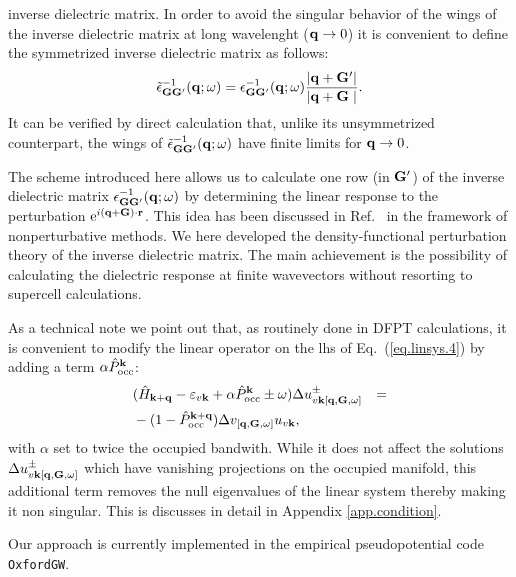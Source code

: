 \documentclass[twocolumn,prb,showpacs,superscriptaddress]{revtex4}
\def\w{\omega}
\def\H{\hat{H}}
\def\P{\hat{P}_{\rm occ}}
\def\E{\varepsilon}
\def\q{{\bf q}}
\def\k{{\bf k}}
\def\G{{\bf G}}
\def\Gp{{\bf G^\prime}}
\def\r{{\bf r}}
\begin{document}
inverse dielectric matrix. 
%
In order to avoid the singular behavior of the wings of the inverse dielectric matrix 
at long wavelenght ($\q\rightarrow 0$) it is convenient to define the symmetrized inverse
dielectric matrix as follows:\cite{balde_tosa}
  \begin{equation}
  \tilde\epsilon^{-1}_{\G\Gp}(\q;\w) = \epsilon^{-1}_{\G\Gp}(\q;\w)  \frac{|\q+\Gp|}{|\q+\G\phantom{^\prime}|}.
  \end{equation}
It can be verified by direct calculation that, unlike its unsymmetrized counterpart,
the wings of $\tilde\epsilon^{-1}_{\G\Gp}(\q;\w)$ have finite limits for $\q\rightarrow 0$.

The scheme introduced here allows us to calculate one row (in $\Gp$) of the inverse dielectric
matrix $\epsilon^{-1}_{\G\Gp}(\q;\w)$ by determining the linear response to the
perturbation ${\rm e}^{i(\q+\G)\cdot\r}$. This idea has been discussed in Ref.\ 
in the framework of nonperturbative methods. We here developed the density-functional
perturbation theory of the inverse dielectric matrix. The main achievement is the
possibility of calculating the dielectric response at finite wavevectors without
resorting to supercell calculations.

As a technical note we point out that, as routinely done in DFPT calculations, 
it is convenient to modify the linear operator on the lhs of Eq.\ (\ref{eq.linsys.4}) by adding
a term $\alpha \P^\k$:
 \begin{eqnarray} \label{eq.linsys.5}
&  (\H_{\k+\q}-\E_{v\k}+\alpha\P^\k \pm\w) \Delta u^\pm_{v\k[\q,\G,\w]}  & = \nonumber \\
&   -(1-\P^{\k+\q}) \Delta v_{[\q,\G,\w]} u_{v\k}, & 
  \end{eqnarray}
with $\alpha$ set to twice the occupied bandwith.
While it does not affect the solutions $\Delta u^\pm_{v\k[\q,\G,\w]}$ which have
vanishing projections on the occupied manifold, this additional term removes
the null eigenvalues of the linear system thereby making it non singular.
This is discusses in detail in Appendix \ref{app.condition}.

Our approach is currently implemented in the empirical
pseudopotential code {\tt OxfordGW}.\cite{oxfordgw}
\end{document}
